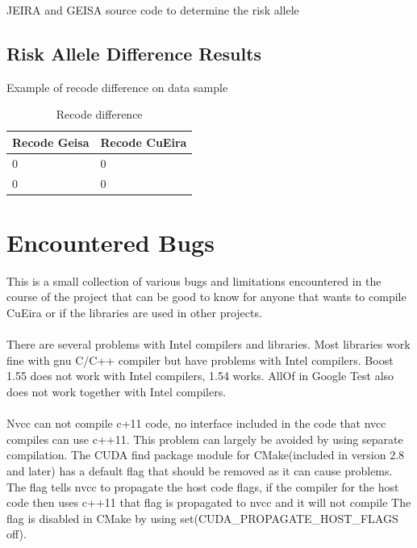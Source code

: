 \documentclass[10pt,a4paper]{report}
\begin{document}
\begin{appendices}
\begin{algorithm}

\BlankLine \BlankLine


\caption{JEIRA and GEISA source code to determine the risk allele}
\label{alg:jeira_geisa_risk_allele}
\end{algorithm}

\subsection{Risk Allele Difference Results}
Example of recode difference on data sample

\begin{table}[h]
\begin{tabular}{| l l |}
  \hline
  Recode Geisa & Recode CuEira \\
  \hline
  0 & 0 \\
  0 & 0 \\
  \hline  
\end{tabular}
\caption{Recode difference}
\label{table:recode_difference}
\end{table}

\section{Encountered Bugs}
\label{found_bugs}
This is a small collection of various bugs and limitations encountered in the course of the project that can be good to know for anyone that wants to compile CuEira or if the libraries are used in other projects.\\
\\
There are several problems with Intel compilers and libraries. Most libraries work fine with gnu C/C++ compiler but have problems with Intel compilers. Boost 1.55 does not work with Intel compilers, 1.54 works. AllOf in Google Test also does not work together with Intel compilers.\\
\\
Nvcc can not compile c+11 code, no interface included in the code that nvcc compiles can use c++11. This problem can largely be avoided by using separate compilation. The CUDA find package module for CMake(included in version 2.8 and later) has a default flag that should be removed as it can cause problems. The flag tells nvcc to propagate the host code flags, if the compiler for the host code then uses c++11 that flag is propagated to nvcc and it will not compile The flag is disabled in CMake by using set(CUDA\_PROPAGATE\_HOST\_FLAGS off).


\end{appendices}
\end{document}
